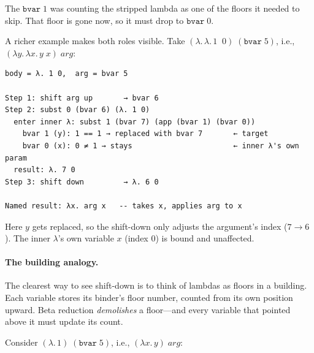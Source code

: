 \documentclass[11pt,a4paper]{article}
\theoremstyle{definition}
\newcommand{\lam}{\lambda}
\begin{document}
The $\texttt{bvar}\;1$ was counting the stripped lambda as one of the floors
it needed to skip. That floor is gone now, so it must drop to
$\texttt{bvar}\;0$.

A richer example makes both roles visible. Take
$(\lam.\, \lam.\, 1\;\;0)\;(\texttt{bvar}\;5)$, i.e.,
$(\lam y.\, \lam x.\, y\;x)\;\mathit{arg}$:

\begin{verbatim}
body = λ. 1 0,  arg = bvar 5

Step 1: shift arg up       → bvar 6
Step 2: subst 0 (bvar 6) (λ. 1 0)
  enter inner λ: subst 1 (bvar 7) (app (bvar 1) (bvar 0))
    bvar 1 (y): 1 == 1 → replaced with bvar 7       ← target
    bvar 0 (x): 0 ≠ 1 → stays                       ← inner λ's own param
  result: λ. 7 0
Step 3: shift down         → λ. 6 0

Named result: λx. arg x   -- takes x, applies arg to x
\end{verbatim}

Here $y$ gets replaced, so the shift-down only adjusts the argument's index
($7 \to 6$). The inner $\lam$'s own variable $x$ (index 0) is bound and
unaffected.

\paragraph{The building analogy.}
The clearest way to see shift-down is to think of lambdas as floors in a
building. Each variable stores its binder's floor number, counted from its own
position upward. Beta reduction \emph{demolishes} a floor---and every variable
that pointed above it must update its count.

Consider $(\lam.\, 1)\;(\texttt{bvar}\;5)$, i.e., $(\lam x.\, y)\;\mathit{arg}$:
\end{document}
